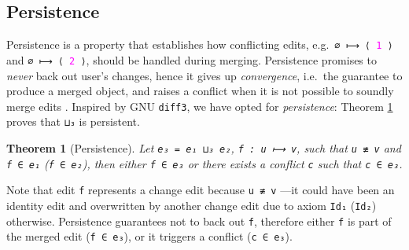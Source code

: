 \documentclass{sigplanconf}
\theoremstyle{plain}
\newtheorem{thm}{Theorem}
\begin{document}
\subsection{Persistence}
Persistence is a property that establishes how conflicting edits,
e.g.\ \texttt{∅ ⟼ ⟨ \textcolor{magenta}{1} ⟩} and \texttt{∅ ⟼ ⟨
  \textcolor{magenta}{2} ⟩}, should be handled during merging.
%
Persistence promises to \emph{never} back out user's changes, hence it
gives up \emph{convergence}, i.e.\ the guarantee to produce a merged
object, and raises a conflict when it is not possible to soundly merge
edits \cite{Pierce07}.
%
Inspired by GNU \texttt{diff3}, we have opted for \emph{persistence}:
Theorem \ref{thm:persistence} proves that \texttt{⊔₃} is persistent.



				
\begin{thm}[Persistence]
\label{thm:persistence}
Let \texttt{e₃ = e₁ ⊔₃ e₂}, \texttt{f : u ⟼ v}, such that \texttt{u ≢
  v} and \texttt{f ∈ e₁} (\texttt{f ∈ e₂}), then either \texttt{f ∈
  e₃} or there exists a conflict \texttt{c} such that \texttt{c ∈ e₃}.
\end{thm}
Note that edit \texttt{f} represents a change edit because \texttt{u ≢
  v} ---it could have been an identity edit and overwritten by another
change edit due to axiom \texttt{Id₁} (\texttt{Id₂}) otherwise.
%
Persistence guarantees not to back out \texttt{f}, therefore either
\texttt{f} is part of the merged edit (\texttt{f ∈ e₃}), or it
triggers a conflict (\texttt{c ∈ e₃}).
%
\end{document}
